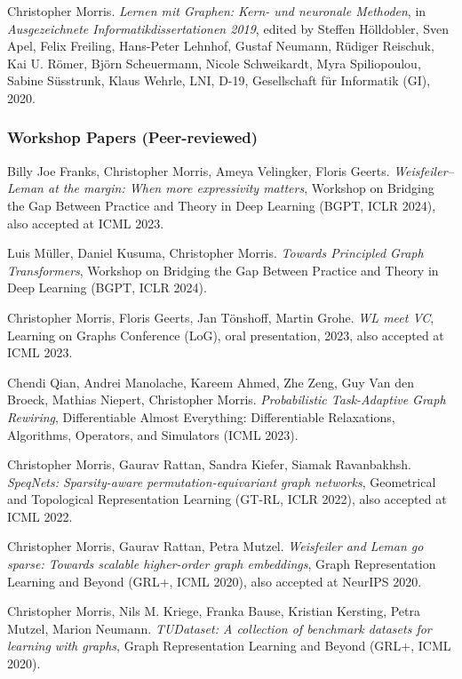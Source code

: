 \documentclass[11pt, a4paper, DIV=14, headings=small]{scrartcl}
\begin{document}
\begin{thebibliography}{15}
		Christopher Morris.
		\emph{Lernen mit Graphen: Kern- und neuronale Methoden}, in
		\emph{Ausgezeichnete Informatikdissertationen 2019}, edited by Steffen H{\"o}lldobler, Sven Apel, Felix Freiling, Hans-Peter Lehnhof, Gustaf Neumann, R{\"u}diger Reischuk, Kai U. R{\"o}mer, Bj{\"o}rn Scheuermann, Nicole Schweikardt, Myra Spiliopoulou, Sabine S{\"u}sstrunk, Klaus Wehrle, LNI, D-19, Gesellschaft f{\"u}r Informatik (GI), 2020.
		
		\subsubsection*{Workshop Papers (Peer-reviewed)}
		Billy Joe Franks, Christopher Morris, Ameya 	Velingker, Floris Geerts.
		\emph{Weisfeiler–Leman at the margin: When more expressivity matters},
		Workshop on Bridging the Gap Between Practice and   Theory in Deep Learning (BGPT, ICLR 2024), also accepted at ICML 2023.
		
		Luis Müller, Daniel Kusuma, Christopher Morris.
		\emph{Towards Principled Graph Transformers},
		Workshop on Bridging the Gap Between Practice and   Theory in Deep Learning (BGPT, ICLR 2024).
		
		
		Christopher Morris, Floris Geerts, Jan Tönshoff, Martin Grohe.
		\emph{WL meet VC},
		Learning on Graphs Conference  (LoG), oral 			presentation, 2023, also accepted at ICML 2023.
						
		Chendi Qian, Andrei Manolache, Kareem Ahmed, Zhe Zeng, Guy Van den Broeck, Mathias Niepert, Christopher Morris.
		\emph{Probabilistic Task-Adaptive Graph Rewiring}, Differentiable Almost Everything: Differentiable Relaxations, Algorithms, Operators, and Simulators (ICML 2023).

		
		Christopher Morris, Gaurav Rattan, Sandra Kiefer, Siamak Ravanbakhsh.
		\emph{SpeqNets: Sparsity-aware permutation-equivariant graph networks},
		Geometrical and Topological Representation Learning (GT-RL, ICLR 2022), also accepted at ICML 2022.
		
		Christopher Morris, Gaurav Rattan, Petra Mutzel.
		\emph{Weisfeiler and Leman go sparse: Towards scalable higher-order graph embeddings},
		Graph Representation Learning and Beyond (GRL+, ICML 2020), also accepted at NeurIPS 2020.
		
		Christopher Morris, Nils M. Kriege, Franka Bause, Kristian Kersting, Petra Mutzel, Marion Neumann.
		\emph{TUDataset: A collection of benchmark datasets for learning with graphs},
		Graph Representation Learning and Beyond (GRL+, ICML 2020).
		

\end{thebibliography}
\end{document}
